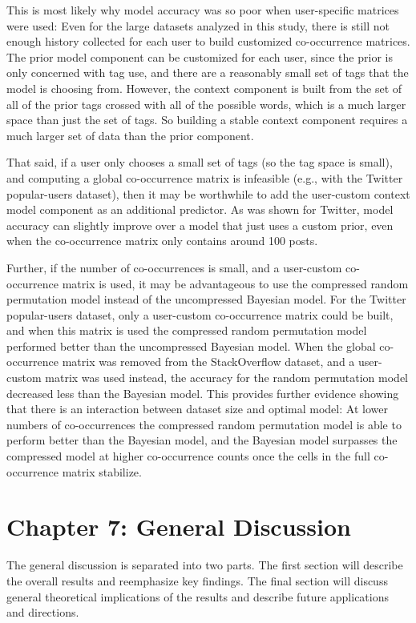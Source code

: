 \documentclass[man,floatsintext,donotrepeattitle]{apa6}
\begin{document}
This is most likely why model accuracy was so poor when user-specific matrices were used:
Even for the large datasets analyzed in this study, there is still not enough history collected for each user to build customized co-occurrence matrices.
The prior model component can be customized for each user, since the prior is only concerned with tag use, and there are a reasonably small set of tags that the model is choosing from.
However, the context component is built from the set of all of the prior tags crossed with all of the possible words, which is a much larger space than just the set of tags.
So building a stable context component requires a much larger set of data than the prior component.

That said, if a user only chooses a small set of tags (so the tag space is small), and computing a global co-occurrence matrix is infeasible (e.g., with the Twitter popular-users dataset), 
then it may be worthwhile to add the user-custom context model component as an additional predictor.
As was shown for Twitter, model accuracy can slightly improve over a model that just uses a custom prior, even when the co-occurrence matrix only contains around 100 posts.

Further, if the number of co-occurrences is small, and a user-custom co-occurrence matrix is used, it may be advantageous to use the compressed random permutation model instead of the uncompressed Bayesian model.
For the Twitter popular-users dataset, only a user-custom co-occurrence matrix could be built, and when this matrix is used the compressed random permutation model performed better than the uncompressed Bayesian model.
When the global co-occurrence matrix was removed from the StackOverflow dataset, and a user-custom matrix was used instead, the accuracy for the random permutation model decreased less than the Bayesian model. 
This provides further evidence showing that there is an interaction between dataset size and optimal model:
At lower numbers of co-occurrences the compressed random permutation model is able to perform better than the Bayesian model,
and the Bayesian model surpasses the compressed model at higher co-occurrence counts once the cells in the full co-occurrence matrix stabilize. 

\clearpage
\section{Chapter 7: General Discussion}

The general discussion is separated into two parts.
The first section will describe the overall results and reemphasize key findings.
The final section will discuss general theoretical implications of the results and describe future applications and directions. 
\end{document}
